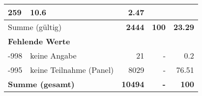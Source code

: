 \begin{longtable}{lXrrr}
       \num{259} &
       \num[round-mode=places,round-precision=2]{10.6} &
         \num[round-mode=places,round-precision=2]{2.47} \\
     \midrule
     \multicolumn{2}{l}{Summe (gültig)} &
       \textbf{\num{2444}} &
     \textbf{\num{100}} &
       \textbf{\num[round-mode=places,round-precision=2]{23.29}} \\
     \multicolumn{5}{l}{\textbf{Fehlende Werte}}\\
       -998 &
       keine Angabe &
         \num{21} &
        - &
         \num[round-mode=places,round-precision=2]{0.2} \\
       -995 &
       keine Teilnahme (Panel) &
         \num{8029} &
        - &
         \num[round-mode=places,round-precision=2]{76.51} \\
     \midrule
     \multicolumn{2}{l}{\textbf{Summe (gesamt)}} &
          \textbf{\num{10494}} &
        \textbf{-} &
        \textbf{\num{100}} \\
     \bottomrule
     \end{longtable}
     
